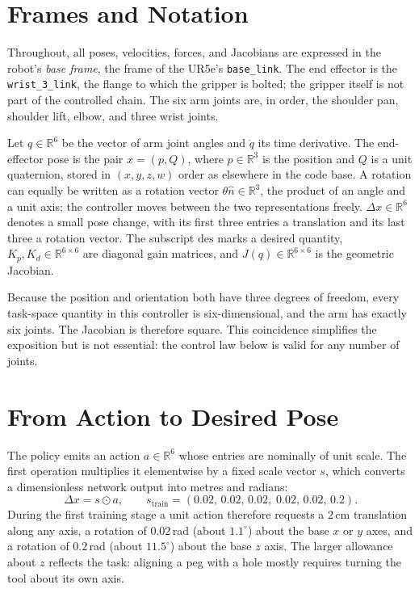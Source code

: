 \documentclass{article}
\newcommand{\R}{\mathbb{R}}
\newcommand{\des}{\mathrm{des}}
\newcommand{\Kp}{K_p}
\newcommand{\Kd}{K_d}
\newcommand{\code}[1]{\texttt{#1}}
\begin{document}
\section{Frames and Notation}
\label{sec:notation}

Throughout, all poses, velocities, forces, and Jacobians are expressed in the robot's \emph{base frame}, the frame of the UR5e's \code{base\_link}. The end effector is the \code{wrist\_3\_link}, the flange to which the gripper is bolted; the gripper itself is not part of the controlled chain. The six arm joints are, in order, the shoulder pan, shoulder lift, elbow, and three wrist joints.

Let $q\in\R^6$ be the vector of arm joint angles and $\dot q$ its time derivative. The end-effector pose is the pair $x=(p,Q)$, where $p\in\R^3$ is the position and $Q$ is a unit quaternion, stored in $(x,y,z,w)$ order as elsewhere in the code base. A rotation can equally be written as a rotation vector $\theta\hat n\in\R^3$, the product of an angle and a unit axis; the controller moves between the two representations freely. $\Delta x\in\R^6$ denotes a small pose change, with its first three entries a translation and its last three a rotation vector. The subscript $\des$ marks a desired quantity, $\Kp,\Kd\in\R^{6\times6}$ are diagonal gain matrices, and $J(q)\in\R^{6\times6}$ is the geometric Jacobian.

Because the position and orientation both have three degrees of freedom, every task-space quantity in this controller is six-dimensional, and the arm has exactly six joints. The Jacobian is therefore square. This coincidence simplifies the exposition but is not essential: the control law below is valid for any number of joints.

\section{From Action to Desired Pose}
\label{sec:target}

The policy emits an action $a\in\R^6$ whose entries are nominally of unit scale. The first operation multiplies it elementwise by a fixed scale vector $s$, which converts a dimensionless network output into metres and radians:
\begin{equation}
  \Delta x = s\odot a, \qquad s_{\text{train}} = (0.02,\,0.02,\,0.02,\;0.02,\,0.02,\,0.2).
\end{equation}
During the first training stage a unit action therefore requests a $2$\,cm translation along any axis, a rotation of $0.02$\,rad (about $1.1^\circ$) about the base $x$ or $y$ axes, and a rotation of $0.2$\,rad (about $11.5^\circ$) about the base $z$ axis. The larger allowance about $z$ reflects the task: aligning a peg with a hole mostly requires turning the tool about its own axis.
\end{document}
